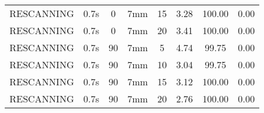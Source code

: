 \begin{table}[H]
\begin{tabular}{|c||c|c|c|c||c|c|c|}
RESCANNING & 0.7s & 0 & 7mm & 15 & 3.28 & 100.00 & 0.00 \\
RESCANNING & 0.7s & 0 & 7mm & 20 & 3.41 & 100.00 & 0.00 \\
RESCANNING & 0.7s & 90 & 7mm & 5 & 4.74 & 99.75 & 0.00 \\
RESCANNING & 0.7s & 90 & 7mm & 10 & 3.04 & 99.75 & 0.00 \\
RESCANNING & 0.7s & 90 & 7mm & 15 & 3.12 & 100.00 & 0.00 \\
RESCANNING & 0.7s & 90 & 7mm & 20 & 2.76 & 100.00 & 0.00 \\
    \hline\hline 
  \end{tabular}
  \label{tab:Pat08_LPV}
\end{table}

\newpage
\thispagestyle{realempty}
\vspace*{-2cm}


